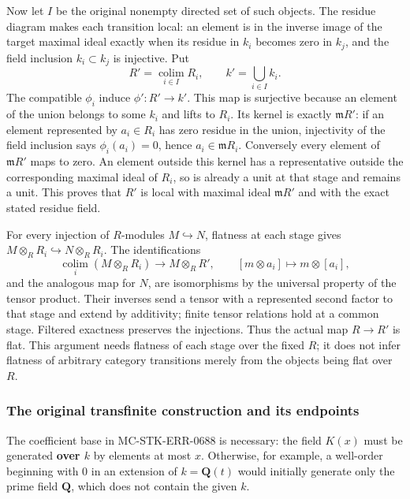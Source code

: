 Now let \(I\) be the original nonempty directed set of such objects. The residue diagram makes each transition local: an element is in the inverse image of the target maximal ideal exactly when its residue in \(k_i\) becomes zero in \(k_j\), and the field inclusion \(k_i\subset k_j\) is injective. Put \[
 R'=\operatorname*{colim}_{i\in I}R_i,\qquad k'=\bigcup_{i\in I}k_i.
\] The compatible \(\phi_i\) induce \(\phi':R'\to k'\). This map is surjective because an element of the union belongs to some \(k_i\) and lifts to \(R_i\). Its kernel is exactly \(\mathfrak mR'\): if an element represented by \(a_i\in R_i\) has zero residue in the union, injectivity of the field inclusion says \(\phi_i(a_i)=0\), hence \(a_i\in\mathfrak mR_i\). Conversely every element of \(\mathfrak mR'\) maps to zero. An element outside this kernel has a representative outside the corresponding maximal ideal of \(R_i\), so is already a unit at that stage and remains a unit. This proves that \(R'\) is local with maximal ideal \(\mathfrak mR'\) and with the exact stated residue field.

For every injection of \(R\)-modules \(M\hookrightarrow N\), flatness at each stage gives \(M\otimes_R R_i\hookrightarrow N\otimes_R R_i\). The identifications \[
 \operatorname*{colim}_i(M\otimes_R R_i)\longrightarrow
 M\otimes_R R',\qquad [m\otimes a_i]\longmapsto m\otimes[a_i],
\] and the analogous map for \(N\), are isomorphisms by the universal property of the tensor product. Their inverses send a tensor with a represented second factor to that stage and extend by additivity; finite tensor relations hold at a common stage. Filtered exactness preserves the injections. Thus the actual map \(R\to R'\) is flat. This argument needs flatness of each stage over the fixed \(R\); it does not infer flatness of arbitrary category transitions merely from the objects being flat over \(R\).

\subsubsection{The original transfinite construction and its endpoints}\label{algebra-proof-064-the-original-transfinite-construction-and-its-endpoints}

The coefficient base in MC-STK-ERR-0688 is necessary: the field \(K(x)\) must be generated \textbf{over \(k\)} by elements at most \(x\). Otherwise, for example, a well-order beginning with \(0\) in an extension of \(k=\mathbf Q(t)\) would initially generate only the prime field \(\mathbf Q\), which does not contain the given \(k\).

